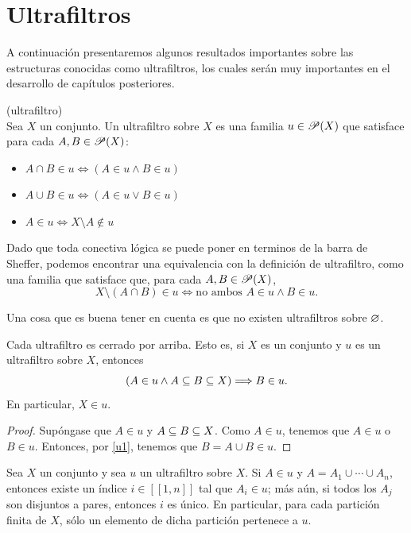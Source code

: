 \section{Ultrafiltros}
\label{sec13}
A continuación presentaremos algunos resultados importantes sobre las estructuras conocidas como ultrafiltros, los cuales serán muy importantes en el desarrollo de capítulos posteriores.
\begin{defn} (ultrafiltro)\label{u1}\\
    Sea $X$ un conjunto. Un ultrafiltro sobre $X$ es una familia $u\in \mathscr{P} (X)$ que satisface para cada $A,B\in \mathscr{P} (X)$:
    \begin{itemize}
        \item $A\cap B\in u\Longleftrightarrow (A\in u\land B\in u)$
        \item $A\cup B\in u\Longleftrightarrow (A\in u\lor B\in u)$
        \item $A\in u\Longleftrightarrow X\setminus A\not\in u$
    \end{itemize}
\end{defn}
\begin{obs}
    Dado que toda conectiva lógica se puede poner en terminos de la barra de Sheffer, podemos encontrar una equivalencia con la definición de ultrafiltro, como una familia que satisface que, para cada $A,B\in \mathscr{P} (X)$,
    \[X\setminus(A\cap B)\in u\Longleftrightarrow\text{no ambos }A\in u\land B\in u.\]
\end{obs}
Una cosa que es buena tener en cuenta es que no existen ultrafiltros sobre $\varnothing$.
\begin{prop}\label{u2}
    Cada ultrafiltro es cerrado por arriba. Esto es, si $X$ es un conjunto y $u$ es un ultrafiltro sobre $X$, entonces 
    \[(A\in u\land A\subseteq B\subseteq X)\Longrightarrow B\in u.\]
    En particular, $X\in u$.
\end{prop}
\begin{proof}
    Supóngase que $A\in u$ y $A\subseteq B\subseteq X$. Como $A\in u$, tenemos que $A\in u$ o $B\in u$. Entonces, por {\ref{u1}}, tenemos que $B=A\cup B\in u$.
\end{proof}
\begin{prop}\label{u3}
    Sea $X$ un conjunto y sea $u$ un ultrafiltro sobre $X$. Si $A\in u$ y $A=A_1\cup\cdots\cup A_n$, entonces existe un índice $i\in[[1,n]]$ tal que $A_i\in u$; más aún, si todos los $A_j$ son disjuntos a pares, entonces $i$ es único. En particular, para cada partición finita de $X$, sólo un elemento de dicha partición pertenece a $u$.
\end{prop}
